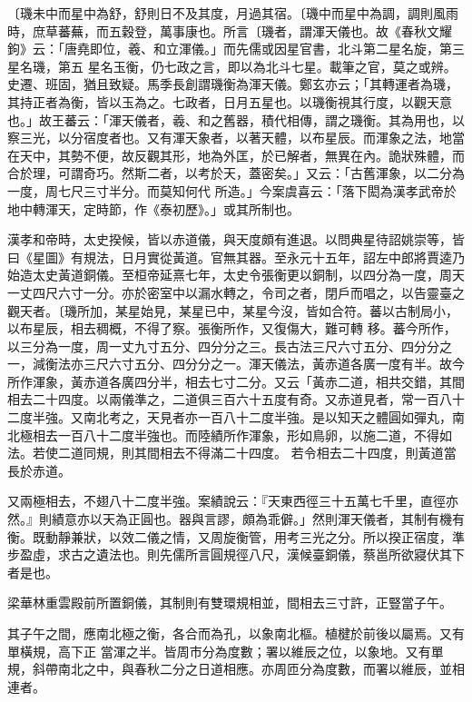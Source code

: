 \begin{pinyinscope}
 〔璣未中而星中為舒，舒則日不及其度，月過其宿。〔璣中而星中為調，調則風雨時，庶草蕃蕪，而五穀登，萬事康也。所言〔璣者，謂渾天儀也。故《春秋文耀鉤》云：「唐堯即位，羲、和立渾儀。」而先儒或因星官書，北斗第二星名旋，第三星名璣，第五
 星名玉衡，仍七政之言，即以為北斗七星。載筆之官，莫之或辨。史遷、班固，猶且致疑。馬季長創謂璣衡為渾天儀。鄭玄亦云；「其轉運者為璣，其持正者為衡，皆以玉為之。七政者，日月五星也。以璣衡視其行度，以觀天意也。」故王蕃云：「渾天儀者，羲、和之舊器，積代相傳，謂之璣衡。其為用也，以察三光，以分宿度者也。又有渾天象者，以著天體，以布星辰。而渾象之法，地當在天中，其勢不便，故反觀其形，地為外匡，於已解者，無異在內。詭狀殊體，而合於理，可謂奇巧。然斯二者，以考於天，蓋密矣。」又云：「古舊渾象，以二分為一度，周七尺三寸半分。而莫知何代
 所造。」今案虞喜云：「落下閎為漢孝武帝於地中轉渾天，定時節，作《泰初歷》。」或其所制也。



 漢孝和帝時，太史揆候，皆以赤道儀，與天度頗有進退。以問典星待詔姚崇等，皆曰《星圖》有規法，日月實從黃道。官無其器。至永元十五年，詔左中郎將賈逵乃始造太史黃道銅儀。至桓帝延熹七年，太史令張衡更以銅制，以四分為一度，周天一丈四尺六寸一分。亦於密室中以漏水轉之，令司之者，閉戶而唱之，以告靈臺之觀天者。〔璣所加，某星始見，某星已中，某星今沒，皆如合符。蕃以古制局小，以布星辰，相去稠概，不得了察。張衡所作，又復傷大，難可轉
 移。蕃今所作，以三分為一度，周一丈九寸五分、四分分之三。長古法三尺六寸五分、四分分之一，減衡法亦三尺六寸五分、四分分之一。渾天儀法，黃赤道各廣一度有半。故今所作渾象，黃赤道各廣四分半，相去七寸二分。又云「黃赤二道，相共交錯，其間相去二十四度。以兩儀準之，二道俱三百六十五度有奇。又赤道見者，常一百八十二度半強。又南北考之，天見者亦一百八十二度半強。是以知天之體圓如彈丸，南北極相去一百八十二度半強也。而陸績所作渾象，形如鳥卵，以施二道，不得如法。若使二道同規，則其間相去不得滿二十四度。
 若令相去二十四度，則黃道當長於赤道。



 又兩極相去，不翅八十二度半強。案績說云：『天東西徑三十五萬七千里，直徑亦然。』則績意亦以天為正圓也。器與言謬，頗為乖僻。」然則渾天儀者，其制有機有衡。既動靜兼狀，以效二儀之情，又周旋衡管，用考三光之分。所以揆正宿度，準步盈虛，求古之遺法也。則先儒所言圓規徑八尺，漢候臺銅儀，蔡邕所欲寢伏其下者是也。



 梁華林重雲殿前所置銅儀，其制則有雙環規相並，間相去三寸許，正豎當子午。



 其子午之間，應南北極之衡，各合而為孔，以象南北樞。植楗於前後以屬焉。又有單橫規，高下正
 當渾之半。皆周市分為度數；署以維辰之位，以象地。又有單規，斜帶南北之中，與春秋二分之日道相應。亦周匝分為度數，而署以維辰，並相連者。




\end{pinyinscope}
